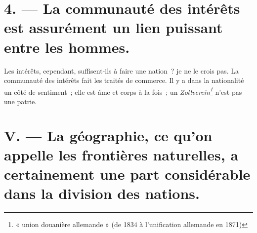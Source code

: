 \documentclass[twoside]{book} %
\newcommand\foreign[1]{\emph{#1}}
\begin{document}
\section[{4. — La communauté des intérêts est assurément un lien puissant entre les hommes.}]{4. — La communauté des intérêts est assurément un lien puissant entre les hommes.}

\noindent Les intérêts, cependant, suffisent-ils à faire une nation ? je ne le crois pas. La communauté des intérêts fait les traités de commerce. Il y a dans la nationalité un côté de sentiment ; elle est âme et corps à la fois ; un \foreign{Zollverein\footnote{« union douanière allemande » (de 1834 à l’unification allemande en 1871)}} n’est pas une patrie.

\section[{V. — La géographie, ce qu’on appelle les frontières naturelles, a certainement une part considérable dans la division des nations.}]{V. — La géographie, ce qu’on appelle les frontières naturelles, a certainement une part considérable dans la division des nations.}
\end{document}
